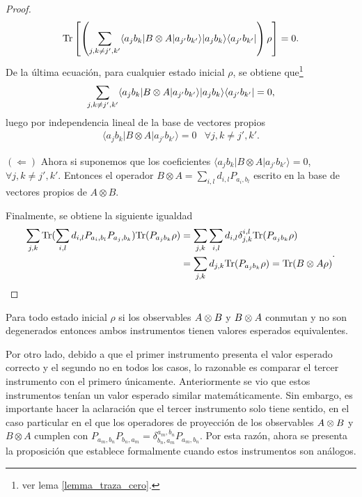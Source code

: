 \begin{proof}
\[\begin{split}
    {\rm Tr}\left[\left(\sum_{j,k\ne j',k'}  \langle a_j b_k |B\otimes A|a_{j'}b_{k'}\rangle |a_j b_k\rangle \langle a_{j'}b_{k'}|\right)\rho\right]&=0.\\
    \end{split}\]
    De la última ecuación, para cualquier estado inicial $\rho$, se obtiene que\footnote[1]{ver lema {\ref{lemma_traza_cero}}.} 
    \[\sum_{j,k\ne j', k'} \langle a_j b_k |B\otimes A|a_{j'}b_{k'}\rangle |a_j b_k\rangle \langle a_{j'}b_{k'}|=0,\] luego por independencia lineal de la base de vectores propios  
     \[\begin{array}{cc}
        \langle a_j b_k |B\otimes A|a_{j'}b_{k'}\rangle=0& \forall j,k\ne j',k'.\end{array}\]

        $(\Leftarrow)$
        Ahora si suponemos que los coeficientes  $\langle a_j b_k |B\otimes A|a_{j'}b_{k'}\rangle=0$,  $\forall j,k\ne j',k'$. Entonces el operador $B\otimes A=\sum_{i,l}d_{i,l}P_{a_i, b_l}$ escrito en la base de vectores propios de $A\otimes B$.
        
        Finalmente, se obtiene la siguiente igualdad \[\begin{split}\sum_{j,k}{\rm Tr}( \sum_{i,l}d_{i,l}P_{a_i, b_l} P_{a_j,b_k}){\rm Tr}(P_{a_j b_k}\rho )&=\sum_{j,k}\sum_{i,l}d_{i,l}\delta_{j,k}^{i,l}{\rm Tr}(P_{a_j b_k}\rho )\\&=\sum_{j,k}d_{j,k}{\rm Tr}(P_{a_j b_k}\rho )={\rm Tr}(B\otimes A\rho)\end{split}.\]


\end{proof}

\begin{corollary}
   Para todo estado inicial $\rho$ si los observables $A\otimes B$ y $B\otimes
A$ conmutan y  no son degenerados entonces ambos instrumentos tienen valores
esperados equivalentes.
\end{corollary}






Por otro lado, debido a que el primer instrumento presenta el valor esperado
correcto y el segundo no en todos los casos, lo razonable es comparar el tercer
instrumento con el primero únicamente. Anteriormente se vio que estos
instrumentos tenían un valor esperado similar matemáticamente. Sin embargo, es
importante hacer la aclaración que el tercer instrumento solo tiene sentido, en
el caso particular en el que los operadores de proyección de los observables
$A\otimes B$ y $B\otimes A$ cumplen con
$P_{a_m,b_n}P_{b_n,a_m}=\delta_{b_n,a_m}^{a_m,b_n}P_{a_m,b_n}$. Por esta razón,
ahora se presenta la proposición que establece formalmente cuando estos
instrumentos son análogos.

